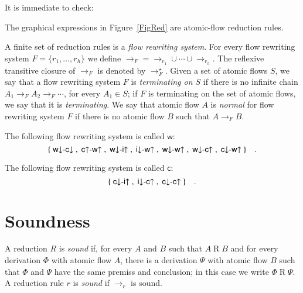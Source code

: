 It is immediate to check:

\begin{proposition}
The graphical expressions in Figure~\ref{FigRed} are atomic-flow reduction rules.
\end{proposition}

\begin{definition}
A finite set of reduction rules is a \emph{flow rewriting system}. For every flow rewriting system $F=\{r_1,\dots,r_h\}$ we define ${\to_F}={\to_{r_1}\cup\cdots\cup{\to_{r_h}}}$. The reflexive transitive closure of $\to_F$ is denoted by $\to_F^\star$. Given a set of atomic flows $S$, we say that a flow rewriting system $F$ is \emph{terminating on $S$} if there is no infinite chain $A_1\to_F A_2\to_F\cdots$, for every $A_1\in S$; if $F$ is terminating on the set of atomic flows, we say that it is \emph{terminating}. We say that atomic flow $A$ is \emph{normal} for flow rewriting system $F$ if there is no atomic flow $B$ such that $A\to_F B$.
\end{definition}

\newcommand{\frw}{{\mathsf w}}
\begin{definition}
The following flow rewriting system is called $\frw$:
\[
\{\;{{\mathsf w}{\downarrow}{\hbox{-}}{\mathsf c}{\downarrow}}\;,\;{{\mathsf c}{\uparrow }{\hbox{-}}{\mathsf w}{\uparrow }}\;,\;{{\mathsf w}{\downarrow}{\hbox{-}}{\mathsf i}{\uparrow }}\;,\;{{\mathsf i}{\downarrow}{\hbox{-}}{\mathsf w}{\uparrow }}\;,\;{{\mathsf w}{\downarrow}{\hbox{-}}{\mathsf w}{\uparrow }}\;,\;{{\mathsf w}{\downarrow}{\hbox{-}}{\mathsf c}{\uparrow }}\;,\;{{\mathsf c}{\downarrow}{\hbox{-}}{\mathsf w}{\uparrow }}\;\}
\quad.
\]
\end{definition}

\newcommand{\frc}{{\mathsf c}}
\begin{definition}
The following flow rewriting system is called $\frc$:
\[
\{\;{{\mathsf c}{\downarrow}{\hbox{-}}{\mathsf i}{\uparrow }}\;,\;{{\mathsf i}{\downarrow}{\hbox{-}}{\mathsf c}{\uparrow }}\;,\;{{\mathsf c}{\downarrow}{\hbox{-}}{\mathsf c}{\uparrow }}\;\}\quad.
\]
\end{definition}

\section{Soundness}

\begin{definition}
A reduction $R$ is \emph{sound} if, for every $A$ and $B$ such that $A\mathrel{R}B$ and for every derivation $\Phi$ with atomic flow $A$, there is a derivation $\Psi$ with atomic flow $B$ such that $\Phi$ and $\Psi$ have the same premiss and conclusion; in this case we write $\Phi\mathrel{R}\Psi$. A reduction rule $r$ is \emph{sound} if $\to_r$ is sound.
\end{definition}

